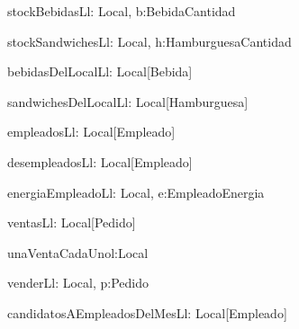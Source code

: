 
\begin{problema}{stockBebidasL}{l: Local, b:Bebida}{Cantidad}
\end{problema}

\begin{problema}{stockSandwichesL}{l: Local, h:Hamburguesa}{Cantidad}
\end{problema}

\begin{problema}[bebidas]{bebidasDelLocalL}{l: Local}{[Bebida]}
\end{problema}

\begin{problema}{sandwichesDelLocalL}{l: Local}{[Hamburguesa]}
\end{problema}

\begin{problema}{empleadosL}{l: Local}{[Empleado]}
\end{problema}

\begin{problema}{desempleadosL}{l: Local}{[Empleado]}
\end{problema}

\begin{problema}[energia]{energiaEmpleadoL}{l: Local, e:Empleado}{Energia}
\end{problema}

\begin{problema}{ventasL}{l: Local}{[Pedido]}
\end{problema}

\begin{problema}{unaVentaCadaUno}{l:Local}{\bool}
\end{problema}

\begin{problema}{venderL}{l: Local, p:Pedido}{}
\end{problema}

\begin{problema}{candidatosAEmpleadosDelMesL}{l: Local}{[Empleado]}

    \medskip

\end{problema}

